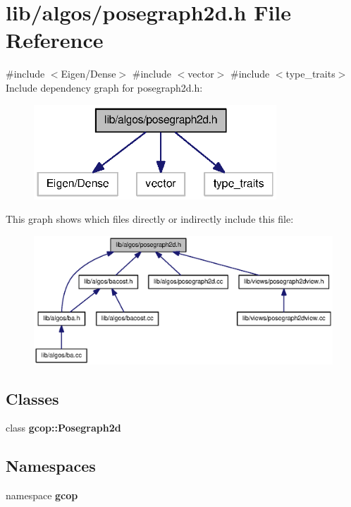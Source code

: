 \section{lib/algos/posegraph2d.h \-File \-Reference}
\label{posegraph2d_8h}
{\ttfamily \#include $<$\-Eigen/\-Dense$>$}\*
{\ttfamily \#include $<$vector$>$}\*
{\ttfamily \#include $<$type\-\_\-traits$>$}\*
\-Include dependency graph for posegraph2d.\-h\-:
\nopagebreak
\begin{figure}[H]
\begin{center}
\leavevmode
\includegraphics[width=258pt]{posegraph2d_8h__incl}
\end{center}
\end{figure}
\-This graph shows which files directly or indirectly include this file\-:
\nopagebreak
\begin{figure}[H]
\begin{center}
\leavevmode
\includegraphics[width=350pt]{posegraph2d_8h__dep__incl}
\end{center}
\end{figure}
\subsection*{\-Classes}
\begin{DoxyCompactItemize}
\item 
class {\bf gcop\-::\-Posegraph2d}
\end{DoxyCompactItemize}
\subsection*{\-Namespaces}
\begin{DoxyCompactItemize}
\item 
namespace {\bf gcop}
\end{DoxyCompactItemize}
